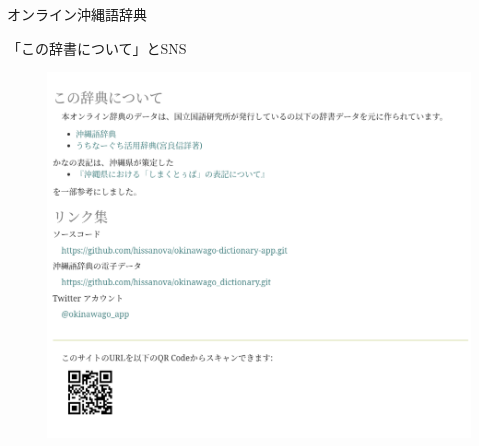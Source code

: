 \documentclass[14pt]{beamer}
\begin{document}


\begin{frame}{オンライン沖縄語辞典}
  \begin{block}{「この辞書について」とSNS}
    \begin{figure}[ht]
      \centering
      \begin{minipage}{0.4\paperwidth}
        \includegraphics[height=0.4\paperheight]{okinawago-app-about.png}
      \end{minipage}%
      \begin{minipage}{0.4\textwidth}

\end{minipage}
\end{figure}
\end{block}
\end{frame}
\end{document}
